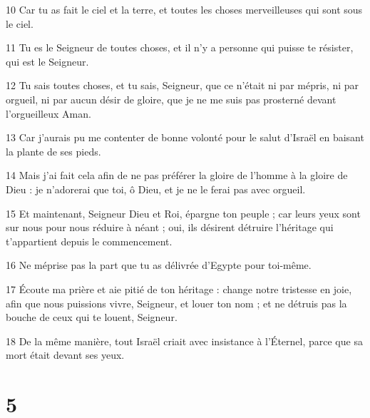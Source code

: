 \par 10 Car tu as fait le ciel et la terre, et toutes les choses merveilleuses qui sont sous le ciel.
\par 11 Tu es le Seigneur de toutes choses, et il n'y a personne qui puisse te résister, qui est le Seigneur.
\par 12 Tu sais toutes choses, et tu sais, Seigneur, que ce n'était ni par mépris, ni par orgueil, ni par aucun désir de gloire, que je ne me suis pas prosterné devant l'orgueilleux Aman.
\par 13 Car j'aurais pu me contenter de bonne volonté pour le salut d'Israël en baisant la plante de ses pieds.
\par 14 Mais j'ai fait cela afin de ne pas préférer la gloire de l'homme à la gloire de Dieu : je n'adorerai que toi, ô Dieu, et je ne le ferai pas avec orgueil.
\par 15 Et maintenant, Seigneur Dieu et Roi, épargne ton peuple ; car leurs yeux sont sur nous pour nous réduire à néant ; oui, ils désirent détruire l’héritage qui t’appartient depuis le commencement.
\par 16 Ne méprise pas la part que tu as délivrée d'Egypte pour toi-même.
\par 17 Écoute ma prière et aie pitié de ton héritage : change notre tristesse en joie, afin que nous puissions vivre, Seigneur, et louer ton nom ; et ne détruis pas la bouche de ceux qui te louent, Seigneur.
\par 18 De la même manière, tout Israël criait avec insistance à l'Éternel, parce que sa mort était devant ses yeux.

\chapter{5}

